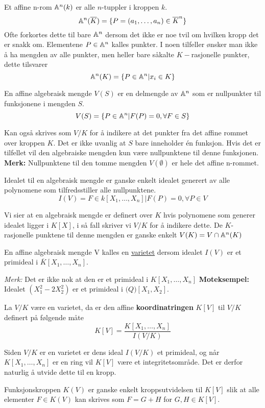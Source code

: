 
\begin{definisjon}
Et affine n-rom $\mathbb{A}^n(k)$ er alle $n$-tuppler i kroppen $k$. 
\begin{equation*}
    \mathbb{A}^n(\overline{K}) = \{P = (a_1, \ldots, a_n) \in \overline{K}^n \}
\end{equation*}
Ofte forkortes dette til bare $\mathbb{A}^n$ dersom det ikke er noe tvil om hvilken kropp det er snakk om. Elementene $P \in \mathbb{A}^n$ kalles punkter. I noen tilfeller ønsker man ikke å ha mengden av alle punkter, men heller bare såkalte $K-$rasjonelle punkter, dette tilsvarer $$\mathbb{A}^n(K) = \{P \in \mathbb{A} ^n | x_i \in K\}$$
\end{definisjon}
\begin{definisjon}En affine algebraisk mengde $V(S)$ er en delmengde av $\mathbb{A}^n$ som er nullpunkter til funksjonene i mengden $S$. 
\begin{equation*}
 V(S) = \{P \in \mathbb{A}^n | F(P) = 0, \forall F \in S\}   
\end{equation*}
\end{definisjon}
Kan også skrives som $V/K$ for å indikere at det punkter fra det affine rommet over kroppen $K$.
Det er ikke uvanlig at $S$ bare inneholder én funksjon. Hvis det er tilfellet vil den algebraiske mengden kun være nullpunktene til denne funksjonen. \textbf{Merk:} Nullpunktene til den tomme mengden $V(\emptyset)$ er hele det affine n-rommet. 
\begin{definisjon}
Idealet til en algebraisk mengde er ganske enkelt idealet generert av alle polynomene som tilfredsstiller alle nullpunktene.
\begin{equation*}
    I(V) = {F \in k[X_1, \ldots, X_n] | F(P) = 0, \forall P \in V}
\end{equation*}
\end{definisjon}
Vi sier at en algebraisk mengde er definert over $K$ hvis polynomene som generer idealet ligger i $K[X]$, i så fall skriver vi $V/K$ for å indikere dette. De $K$-rasjonelle punktene til denne mengden  er ganske enkelt $V(K) = V \cap \mathbb{A}^n(K) $
\begin{definisjon}En affine algebraisk mengde V kalles en \underline{varietet} dersom idealet $I(V)$ er et primideal i $\overline{K}[X_1, \ldots, X_n]$.
\end{definisjon}
\textit{Merk:} Det er ikke nok at den er et primideal i $K[X_1, \ldots, X_n]$
\textbf{Moteksempel:} Idealet $(X_1^2 - 2X_2^2)$ er et primideal i $\mathcal(Q)[X_1, X_2]$.
\begin{definisjon}
La $V/K$ være en varietet, da er den affine \textbf{koordinatringen} $K[V]$ til $V/K$ definert på følgende måte
\begin{equation*}
    K[V] = \frac{K[X_1, \ldots, X_n]}{I(V/K)}
\end{equation*}
\end{definisjon}
Siden $V/K$ er en varietet er dens ideal $I(V/K)$ et primideal, og når $K[X_1, \ldots, X_n]$ er en ring vil $K[V]$ være et integritetsområde. Det er derfor naturlig å utvide dette til en kropp.
\begin{definisjon}
Funksjonskroppen $K(V)$ er ganske enkelt kroppsutvidelsen til $K[V]$ slik at alle elementer $F \in K(V)$ kan skrives som $F = G + H$ for $G, H \in K[V]$.
\end{definisjon}

